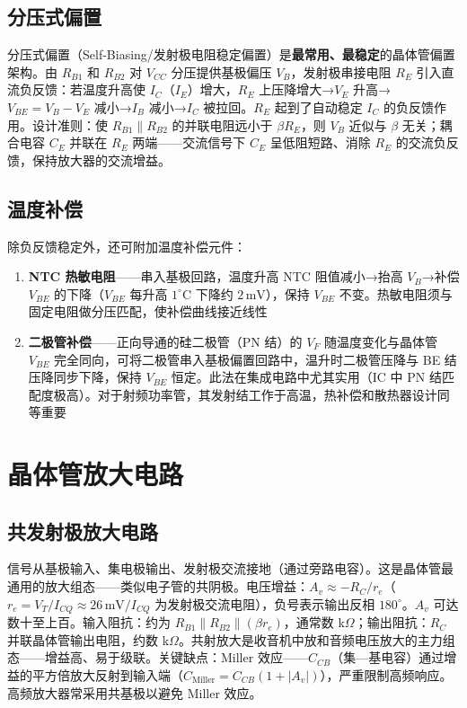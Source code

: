 \documentclass[12pt,UTF8]{ctexbook}
\begin{document}
\subsection{分压式偏置}

分压式偏置（Self-Biasing/发射极电阻稳定偏置）是\textbf{最常用、最稳定}的晶体管偏置架构。由 $R_{B1}$ 和 $R_{B2}$ 对 $V_{CC}$ 分压提供基极偏压 $V_B$，发射极串接电阻 $R_E$ 引入直流负反馈：若温度升高使 $I_C$（$I_E$）增大，$R_E$ 上压降增大→$V_E$ 升高→$V_{BE} = V_B - V_E$ 减小→$I_B$ 减小→$I_C$ 被拉回。$R_E$ 起到了自动稳定 $I_C$ 的负反馈作用。设计准则：使 $R_{B1}\parallel R_{B2}$ 的并联电阻远小于 $\beta R_E$，则 $V_B$ 近似与 $\beta$ 无关；耦合电容 $C_E$ 并联在 $R_E$ 两端——交流信号下 $C_E$ 呈低阻短路、消除 $R_E$ 的交流负反馈，保持放大器的交流增益。

\subsection{温度补偿}

除负反馈稳定外，还可附加温度补偿元件：
\begin{enumerate}
\item \textbf{NTC 热敏电阻}——串入基极回路，温度升高 NTC 阻值减小→抬高 $V_B$→补偿 $V_{BE}$ 的下降（$V_{BE}$ 每升高 $1^\circ\mathrm{C}$ 下降约 $2\,\mathrm{mV}$），保持 $V_{BE}$ 不变。热敏电阻须与固定电阻做分压匹配，使补偿曲线接近线性
\item \textbf{二极管补偿}——正向导通的硅二极管（PN 结）的 $V_F$ 随温度变化与晶体管 $V_{BE}$ 完全同向，可将二极管串入基极偏置回路中，温升时二极管压降与 BE 结压降同步下降，保持 $V_{BE}$ 恒定。此法在集成电路中尤其实用（IC 中 PN 结匹配度极高）。对于射频功率管，其发射结工作于高温，热补偿和散热器设计同等重要
\end{enumerate}

\section{晶体管放大电路}
\label{sec:transistor_amplifier}

\subsection{共发射极放大电路}

信号从基极输入、集电极输出、发射极交流接地（通过旁路电容）。这是晶体管最通用的放大组态——类似电子管的共阴极。电压增益：$A_v \approx -R_C/r_e$（$r_e = V_T/I_{CQ} \approx 26\,\mathrm{mV}/I_{CQ}$ 为发射极交流电阻），负号表示输出反相 $180^\circ$。$A_v$ 可达数十至上百。输入阻抗：约为 $R_{B1}\parallel R_{B2}\parallel (\beta r_e)$，通常数 k$\Omega$；输出阻抗：$R_C$ 并联晶体管输出电阻，约数 k$\Omega$。共射放大是收音机中放和音频电压放大的主力组态——增益高、易于级联。关键缺点：Miller 效应——$C_{CB}$（集—基电容）通过增益的平方倍放大反射到输入端（$C_{\text{Miller}} = C_{CB}(1+|A_v|)$），严重限制高频响应。高频放大器常采用共基极以避免 Miller 效应。
\end{document}
